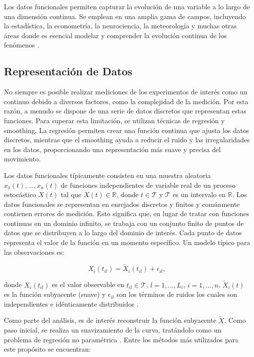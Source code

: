 Los datos funcionales permiten capturar la evolución de una variable a lo largo de una dimensión continua. Se emplean en una amplia gama de campos, incluyendo la estadística, la econometría, la neurociencia, la meteorología y muchas otras áreas donde es esencial modelar y comprender la evolución continua de los fenómenos \cite{boxplotFun}.

\subsection{Representación de Datos}

No siempre es posible realizar mediciones de los experimentos de interés como un continuo debido a diversos factores, como la complejidad de la medición. Por esta razón, a menudo se dispone de una serie de datos discretos que representan estas funciones. Para superar esta limitación, se utilizan técnicas de regresión y smoothing. La regresión permiten crear una función continua que ajusta los datos discretos, mientras que el smoothing ayuda a reducir el ruido y las irregularidades en los datos, proporcionando una representación más suave y precisa del movimiento.

Los datos funcionales típicamente consisten en una muestra aleatoria $x_1(t), \dots , x_n(t)$ de funciones independientes de variable real de un proceso estocástico $X(t)$ tal que $X(t) \in \mathbb{R}$,  donde $t \in \mathcal{T}$ y $\mathcal{T}$ es un intervalo en $\mathbb{R}$. Los datos funcionales se representan en enrejados discretos y finitos y comúnmente contienen errores de medición. Esto significa que, en lugar de tratar con funciones continuas en un dominio infinito, se trabaja con un conjunto finito de puntos de datos que se distribuyen a lo largo del dominio de interés. Cada punto de datos representa el valor de la función en un momento específico. Un modelo típico para las observaciones es:

\begin{equation}
     X_i(t_{il}) = \widetilde{X}_i(t_{il}) + \epsilon_{il},
\end{equation}

donde $X_i(t_{il})$ es el valor observable en $t_{il} \in \mathcal{T}$, $l = 1, \dots, L_{i}$, $i = 1, \dots, n$, $\widetilde{X}_i(t)$ es la función subyacente (suave) y $\epsilon_{il}$ son los términos de ruidos los cuales son independientes e idénticamente distribuidos \cite{Gertheiss}.

Como parte del análisis, es de interés reconstruir la función subyacente $\widetilde{X}$. Como paso inicial, se realiza un suavizamiento de la curva, tratándolo como un problema de regresión no paramétrica \cite{Gertheiss}. Entre los métodos más utilizados para este propósito se encuentran: 


